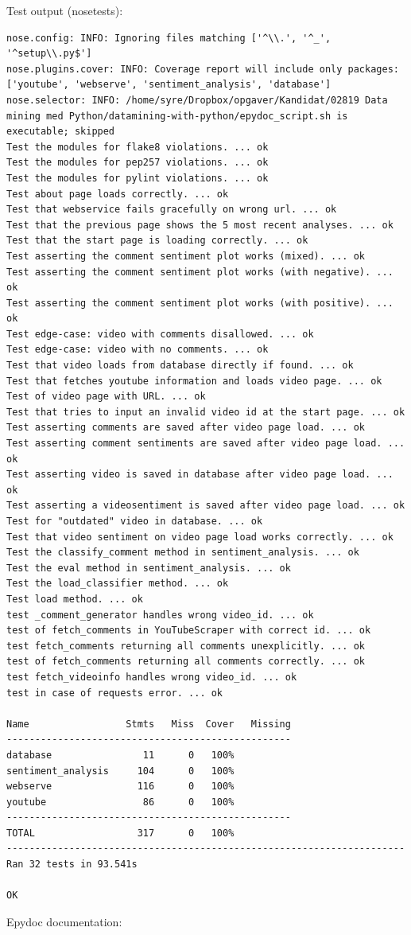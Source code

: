\documentclass[conference]{IEEEtran}
\begin{document}
Test output (nosetests): 
\begin{verbatim}
nose.config: INFO: Ignoring files matching ['^\\.', '^_', '^setup\\.py$']
nose.plugins.cover: INFO: Coverage report will include only packages: ['youtube', 'webserve', 'sentiment_analysis', 'database']
nose.selector: INFO: /home/syre/Dropbox/opgaver/Kandidat/02819 Data mining med Python/datamining-with-python/epydoc_script.sh is executable; skipped
Test the modules for flake8 violations. ... ok
Test the modules for pep257 violations. ... ok
Test the modules for pylint violations. ... ok
Test about page loads correctly. ... ok
Test that webservice fails gracefully on wrong url. ... ok
Test that the previous page shows the 5 most recent analyses. ... ok
Test that the start page is loading correctly. ... ok
Test asserting the comment sentiment plot works (mixed). ... ok
Test asserting the comment sentiment plot works (with negative). ... ok
Test asserting the comment sentiment plot works (with positive). ... ok
Test edge-case: video with comments disallowed. ... ok
Test edge-case: video with no comments. ... ok
Test that video loads from database directly if found. ... ok
Test that fetches youtube information and loads video page. ... ok
Test of video page with URL. ... ok
Test that tries to input an invalid video id at the start page. ... ok
Test asserting comments are saved after video page load. ... ok
Test asserting comment sentiments are saved after video page load. ... ok
Test asserting video is saved in database after video page load. ... ok
Test asserting a videosentiment is saved after video page load. ... ok
Test for "outdated" video in database. ... ok
Test that video sentiment on video page load works correctly. ... ok
Test the classify_comment method in sentiment_analysis. ... ok
Test the eval method in sentiment_analysis. ... ok
Test the load_classifier method. ... ok
Test load method. ... ok
test _comment_generator handles wrong video_id. ... ok
test of fetch_comments in YouTubeScraper with correct id. ... ok
test fetch_comments returning all comments unexplicitly. ... ok
test of fetch_comments returning all comments correctly. ... ok
test fetch_videoinfo handles wrong video_id. ... ok
test in case of requests error. ... ok

Name                 Stmts   Miss  Cover   Missing
--------------------------------------------------
database                11      0   100%   
sentiment_analysis     104      0   100%   
webserve               116      0   100%   
youtube                 86      0   100%   
--------------------------------------------------
TOTAL                  317      0   100%   
----------------------------------------------------------------------
Ran 32 tests in 93.541s

OK

\end{verbatim}
Epydoc documentation:

\end{document}
